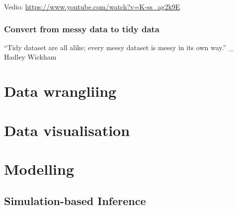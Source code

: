 \documentclass[]{book}
\begin{document}
Vedio: \url{https://www.youtube.com/watch?v=K-ss_ag2k9E}

\hypertarget{convert-from-messy-data-to-tidy-data}{%
\subsection{Convert from messy data to tidy data}\label{convert-from-messy-data-to-tidy-data}}

``Tidy dataset are all alike; every messy dataset is messy in its own way.'' \_ Hadley Wickham

\hypertarget{data-wrangliing}{%
\chapter{Data wrangliing}\label{data-wrangliing}}

\hypertarget{data-visualisation}{%
\chapter{Data visualisation}\label{data-visualisation}}

\hypertarget{modelling}{%
\chapter{Modelling}\label{modelling}}

\hypertarget{simulation-based-inference}{%
\section{Simulation-based Inference}\label{simulation-based-inference}}


\end{document}
